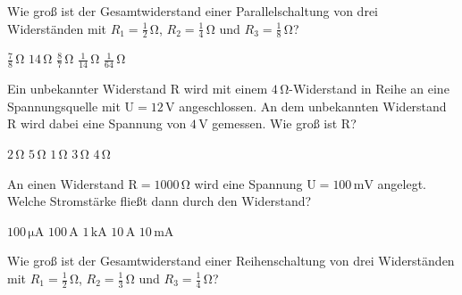 \documentclass[11pt]{exam}
\begin{document}
\setlength{\voffset}{-0.5in}
\setlength{\headsep}{5pt}

\hspace{2mm}
 \hspace{5mm}
\vspace{4mm}

\begin{questions}

\question Wie groß ist der Gesamtwiderstand einer Parallelschaltung von drei Widerständen mit \(R_1=\mathrm{\frac{1}{2}\,\Omega}\), \(R_2=\mathrm{\frac{1}{4}\,\Omega}\) und \(R_3=\mathrm{\frac{1}{8}\,\Omega}\)?

\begin{choices}
	\choice \(\mathrm{\frac{7}{8}\,\Omega}\)
	\choice \(\mathrm{14\,\Omega}\)
	\choice \(\mathrm{\frac{8}{7}\,\Omega}\)
	\choice \(\mathrm{\frac{1}{14}\,\Omega}\)
	\choice \(\mathrm{\frac{1}{64}\,\Omega}\)
\end{choices}

\vspace{3mm}\question Ein unbekannter Widerstand \(\mathrm{R}\) wird mit einem \(\mathrm{4\,\Omega}\)-Widerstand in Reihe an eine Spannungsquelle mit \(\mathrm{U=12\,V}\) angeschlossen. An dem unbekannten Widerstand \(\mathrm{R}\) wird dabei eine Spannung von \(\mathrm{4\,V}\) gemessen. Wie groß ist \(\mathrm{R}\)?

\begin{choices}
	\choice \(\mathrm{2\,\Omega}\)
	\choice \(\mathrm{5\,\Omega}\)
	\choice \(\mathrm{1\,\Omega}\)
	\choice \(\mathrm{3\,\Omega}\)
	\choice \(\mathrm{4\,\Omega}\)
\end{choices}

\vspace{3mm}\question An einen Widerstand \(\mathrm{R=1000\,\Omega}\) wird eine Spannung \(\mathrm{U=100\,mV}\) angelegt. Welche Stromstärke fließt dann durch den Widerstand?

\begin{choices}
	\choice \(\mathrm{100\,\mu A}\)
	\choice \(\mathrm{100\,A}\)
	\choice \(\mathrm{1\,kA}\)
	\choice \(\mathrm{10\,A}\)
	\choice \(\mathrm{10\,mA}\)
\end{choices}

\vspace{3mm}\question Wie groß ist der Gesamtwiderstand einer Reihenschaltung von drei Widerständen mit \(R_1=\mathrm{\frac{1}{2}\,\Omega}\), \(R_2=\mathrm{\frac{1}{3}\,\Omega}\) und \(R_3=\mathrm{\frac{1}{4}\,\Omega}\)?


\end{questions}
\end{document}
